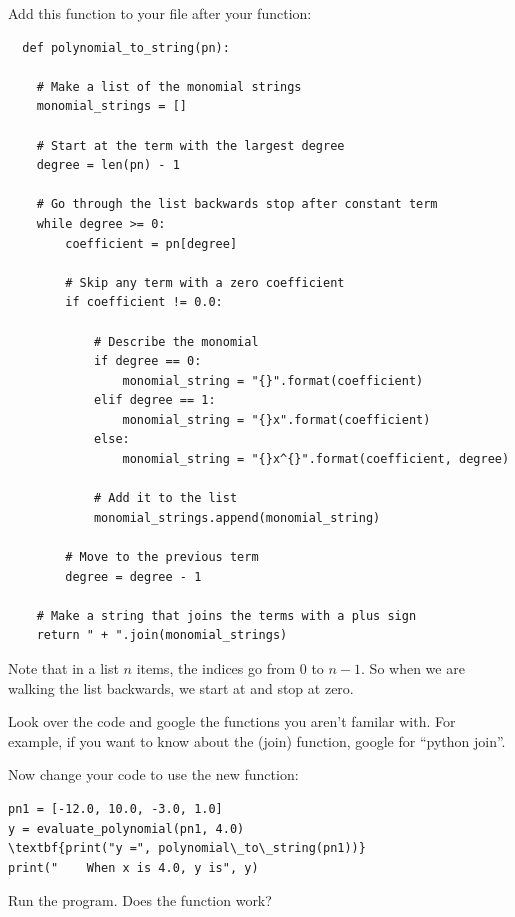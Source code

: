 Add this function to your  file after your  function:
\begin{Verbatim}
  def polynomial_to_string(pn):
    
    # Make a list of the monomial strings
    monomial_strings = []

    # Start at the term with the largest degree
    degree = len(pn) - 1

    # Go through the list backwards stop after constant term
    while degree >= 0:
        coefficient = pn[degree]

        # Skip any term with a zero coefficient
        if coefficient != 0.0:

            # Describe the monomial
            if degree == 0:
                monomial_string = "{}".format(coefficient)
            elif degree == 1:
                monomial_string = "{}x".format(coefficient)
            else:
                monomial_string = "{}x^{}".format(coefficient, degree)
                
            # Add it to the list
            monomial_strings.append(monomial_string)

        # Move to the previous term
        degree = degree - 1

    # Make a string that joins the terms with a plus sign
    return " + ".join(monomial_strings)
\end{Verbatim}

Note that in a list $n$ items, the indices go from 0 to $n-1$. So when
we are walking the list backwards, we start at  and stop at zero.

Look over the code and google the functions you aren't familar
with. For example, if you want to know about the \pyfunction(join)
function, google for ``python join''.

Now change your code to use the new function:
\begin{Verbatim}[commandchars=\\\{\}]
pn1 = [-12.0, 10.0, -3.0, 1.0]
y = evaluate_polynomial(pn1, 4.0)
\textbf{print("y =", polynomial\_to\_string(pn1))}
print("    When x is 4.0, y is", y)
\end{Verbatim}

Run the program. Does the function work?

